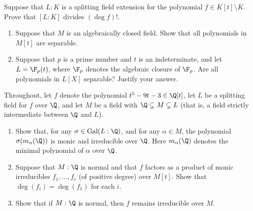 \documentclass{article}
\begin{document}
 Suppose that \( L : K \) is a splitting field extension for the polynomial \( f \in K[t] \setminus K \). Prove that \( [L : K] \) divides \( (\deg f)! \).

\begin{enumerate}[label=(\alph*)]
  \item Suppose that \( M \) is an algebraically closed field. Show that all polynomials in \( M[t] \) are separable.

  \item Suppose that \( p \) is a prime number and \( t \) is an indeterminate, and let \( L = \F_p(t) \), where \( \F_p \) denotes the algebraic closure of \( \F_p \). Are all polynomials in \( L[X] \) separable? Justify your answer.
\end{enumerate}


 Throughout, let \( f \) denote the polynomial \( t^5 - 9t - 3 \in \Q[t] \), let \( L \) be a splitting field for \( f \) over \( \Q \), and let \( M \) be a field with \( \Q \subsetneq M \subsetneq L \) (that is, a field strictly intermediate between \( \Q \) and \( L \)).
\begin{enumerate}[label=(\alph*)]
  \item Show that, for any \( \sigma \in \mathrm{Gal}(L : \Q) \), and for any \( \alpha \in M \), the polynomial \( \sigma(m_\alpha(\Q)) \) is monic and irreducible over \( \Q \). Here \( m_\alpha(\Q) \) denotes the minimal polynomial of \( \alpha \) over \( \Q \).

  \item Suppose that \( M : \Q \) is normal and that \( f \) factors as a product of monic irreducibles \( f_1, \dots, f_r \) (of positive degree) over \( M[t] \). Show that \( \deg(f_i) = \deg(f_1) \) for each \( i \).

  \item Show that if \( M : \Q \) is normal, then \( f \) remains irreducible over \( M \).
\end{enumerate}
\end{document}
